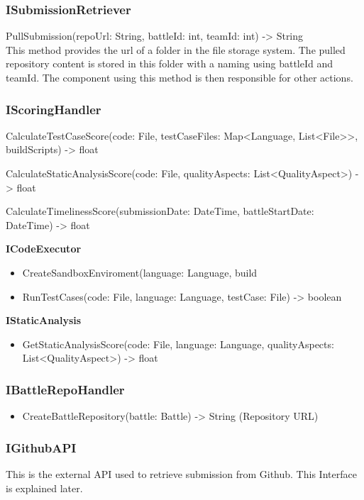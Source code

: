\subsubsection{ISubmissionRetriever}
    \item PullSubmission(repoUrl: String, battleId: int, teamId: int) -> String \\
    This method provides the url of a folder in the file storage system. The pulled repository content is stored in this folder with a naming using battleId and teamId. The component using this method is then responsible for other actions. 
\subsubsection{IScoringHandler}
   \item CalculateTestCaseScore(code: File, testCaseFiles: Map<Language, List<File>>, buildScripts) -> float
   \item CalculateStaticAnalysisScore(code: File, qualityAspects: List<QualityAspect>) -> float
   \item CalculateTimelinessScore(submissionDate: DateTime, battleStartDate: DateTime) -> float
   \item \textbf{ICodeExecutor}
   \begin{itemize}
        \item CreateSandboxEnviroment(language: Language, build
       \item RunTestCases(code: File, language: Language, testCase: File) -> boolean
   \end{itemize}
   \item \textbf{IStaticAnalysis}
   \begin{itemize}
       \item GetStaticAnalysisScore(code: File, language: Language, qualityAspects: List<QualityAspect>) -> float
   \end{itemize}
\subsubsection{IBattleRepoHandler}
\begin{itemize}
    \item CreateBattleRepository(battle: Battle) -> String (Repository URL)
\end{itemize}
\subsubsection{IGithubAPI}
This is the external API used to retrieve submission from Github. This Interface is explained later.
